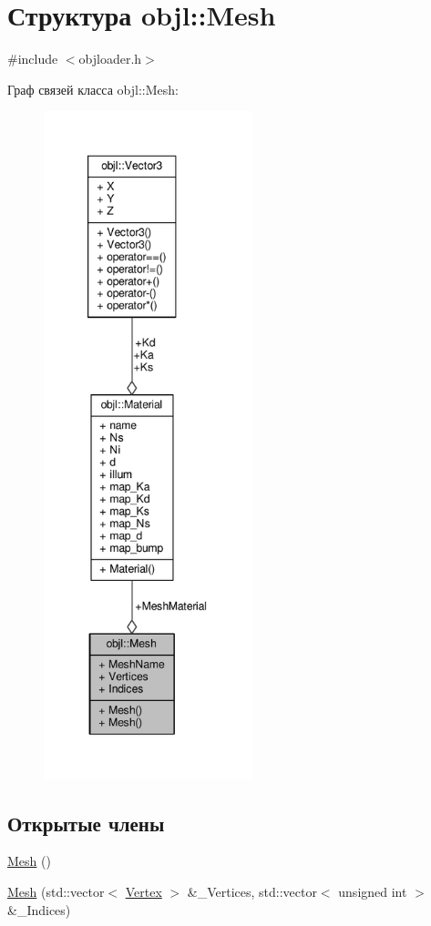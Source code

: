 \hypertarget{structobjl_1_1_mesh}{}\section{Структура objl\+:\+:Mesh}
\label{structobjl_1_1_mesh}


{\ttfamily \#include $<$objloader.\+h$>$}



Граф связей класса objl\+:\+:Mesh\+:
\nopagebreak
\begin{figure}[H]
\begin{center}
\leavevmode
\includegraphics[height=550pt]{da/d28/structobjl_1_1_mesh__coll__graph}
\end{center}
\end{figure}
\subsection*{Открытые члены}
\begin{DoxyCompactItemize}
\item 
\hyperlink{structobjl_1_1_mesh_ae0e6cf65fb4d0c413db9bb400e086699}{Mesh} ()
\item 
\hyperlink{structobjl_1_1_mesh_a760b29568d67acac05e26e73381fe68d}{Mesh} (std\+::vector$<$ \hyperlink{structobjl_1_1_vertex}{Vertex} $>$ \&\+\_\+\+Vertices, std\+::vector$<$ unsigned int $>$ \&\+\_\+\+Indices)
\end{DoxyCompactItemize}
